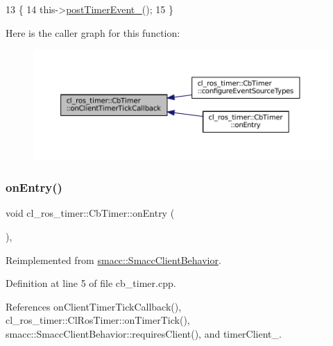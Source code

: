 \begin{DoxyCode}
13 \{
14     this->\hyperlink{classcl__ros__timer_1_1CbTimer_ad2b7913a84459d635fdcca8d346c7af2}{postTimerEvent\_}();
15 \}
\end{DoxyCode}
Here is the caller graph for this function\+:
\nopagebreak
\begin{figure}[H]
\begin{center}
\leavevmode
\includegraphics[width=350pt]{classcl__ros__timer_1_1CbTimer_a9895eb7e05a5922fa27f2bc46f5486a0_icgraph}
\end{center}
\end{figure}
\mbox{\label{classcl__ros__timer_1_1CbTimer_aceba45e86271cf1b7333e2f42c246a38}} 
\subsubsection{\texorpdfstring{on\+Entry()}{onEntry()}}
{\footnotesize\ttfamily void cl\+\_\+ros\+\_\+timer\+::\+Cb\+Timer\+::on\+Entry (\begin{DoxyParamCaption}{ }\end{DoxyParamCaption})\hspace{0.3cm}{\ttfamily [override]}, {\ttfamily [virtual]}}



Reimplemented from \hyperlink{classsmacc_1_1SmaccClientBehavior_a7962382f93987c720ad432fef55b123f}{smacc\+::\+Smacc\+Client\+Behavior}.



Definition at line 5 of file cb\+\_\+timer.\+cpp.



References on\+Client\+Timer\+Tick\+Callback(), cl\+\_\+ros\+\_\+timer\+::\+Cl\+Ros\+Timer\+::on\+Timer\+Tick(), smacc\+::\+Smacc\+Client\+Behavior\+::requires\+Client(), and timer\+Client\+\_\+.


